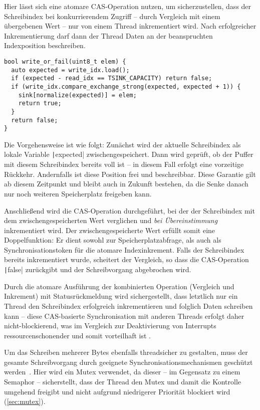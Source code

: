 Hier lässt sich eine atomare \ac{CAS}-Operation nutzen, um sicherzustellen, dass
der Schreibindex bei konkurrierendem Zugriff -- durch Vergleich mit einem
übergebenen Wert -- nur von einem Thread inkrementiert wird. Nach erfolgreicher
Inkrementierung darf dann der Thread Daten an der beanspruchten Indexposition
beschreiben.

\begin{code}
\begin{verbatim}
bool write_or_fail(uint8_t elem) {
  auto expected = write_idx.load();
  if (expected - read_idx == TSINK_CAPACITY) return false;
  if (write_idx.compare_exchange_strong(expected, expected + 1)) {
    sink[normalize(expected)] = elem;
    return true;
  }
  return false;
}
\end{verbatim}
\end{code}

Die Vorgehensweise ist wie folgt: Zunächst wird der aktuelle Schreibindex als
lokale Variable \texttt|expected| zwischengespeichert. Dann wird
geprüft, ob der Puffer mit diesem Schreibindex bereits voll ist -- in diesem
Fall erfolgt eine vorzeitige Rückkehr. Andernfalls ist diese Position frei und
beschreibbar. Diese Garantie gilt ab diesem Zeitpunkt und bleibt auch in Zukunft
bestehen, da die Senke danach nur noch weiteren Speicherplatz freigeben kann.

Anschließend wird die CAS-Operation durchgeführt, bei der der Schreibindex mit
dem zwischengespeicherten Wert verglichen und \textit{bei Übereinstimmung}
inkrementiert wird. Der zwischengespeicherte Wert erfüllt somit eine
Doppelfunktion: Er dient sowohl zur Speicherplatzabfrage, als auch als
Synchronisationstoken für die atomare Indexinkrement. Falls der Schreibindex
bereits inkrementiert wurde, scheitert der Vergleich, so dass die CAS-Operation
\texttt|false| zurückgibt und der Schreibvorgang abgebrochen wird.

Durch die atomare Ausführung der kombinierten Operation (Vergleich und
Inkrement) mit Statusrückmeldung wird sichergestellt, dass letztlich nur ein
Thread den Schreibindex erfolgreich inkrementieren und folglich Daten schreiben
kann -- diese CAS-basierte Synchronisation mit anderen Threads erfolgt daher
nicht-blockierend, was im Vergleich zur Deaktivierung von Interrupts
ressourcenschonender und somit vorteilhaft ist \cite{wikipedia_cas}.

Um das Schreiben mehrerer Bytes ebenfalls threadsicher zu gestalten, muss der
gesamte Schreibvorgang durch geeignete Synchronisationsmechanismen geschützt
werden~\cite{FreeRTOSForumPrintf}. Hier wird ein Mutex verwendet, da dieser --
im Gegensatz zu einem Semaphor -- sicherstellt, dass der Thread den Mutex und
damit die Kontrolle umgehend freigibt und nicht aufgrund niedrigerer Priorität
blockiert wird (\ref{sec:mutex}).

